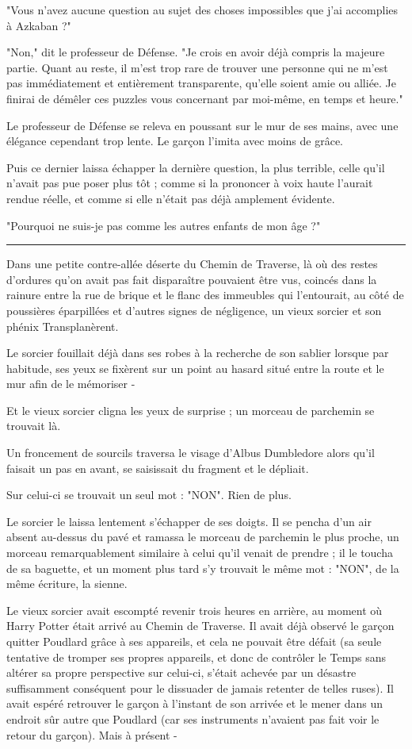 "Vous n'avez aucune question au sujet des choses impossibles que j'ai accomplies à Azkaban ?"

"Non," dit le professeur de Défense. "Je crois en avoir déjà compris la majeure partie. Quant au reste, il m'est trop rare de trouver une personne qui ne m'est pas immédiatement et entièrement transparente, qu'elle soient amie ou alliée. Je finirai de démêler ces puzzles vous concernant par moi-même, en temps et heure."

Le professeur de Défense se releva en poussant sur le mur de ses mains, avec une élégance cependant trop lente. Le garçon l'imita avec moins de grâce.

Puis ce dernier laissa échapper la dernière question, la plus terrible, celle qu'il n'avait pas pue poser plus tôt ; comme si la prononcer à voix haute l'aurait rendue réelle, et comme si elle n'était pas déjà amplement évidente.

"Pourquoi ne suis-je pas comme les autres enfants de mon âge ?"
\par\noindent\rule{\textwidth}{0.4pt}
Dans une petite contre-allée déserte du Chemin de Traverse, là où des restes d'ordures qu'on avait pas fait disparaître pouvaient être vus, coincés dans la rainure entre la rue de brique et le flanc des immeubles qui l'entourait, au côté de poussières éparpillées et d'autres signes de négligence, un vieux sorcier et son phénix Transplanèrent.

Le sorcier fouillait déjà dans ses robes à la recherche de son sablier lorsque par habitude, ses yeux se fixèrent sur un point au hasard situé entre la route et le mur afin de le mémoriser -

Et le vieux sorcier cligna les yeux de surprise ; un morceau de parchemin se trouvait là.

Un froncement de sourcils traversa le visage d'Albus Dumbledore alors qu'il faisait un pas en avant, se saisissait du fragment et le dépliait.

Sur celui-ci se trouvait un seul mot : "NON". Rien de plus.

Le sorcier le laissa lentement s'échapper de ses doigts. Il se pencha d'un air absent au-dessus du pavé et ramassa le morceau de parchemin le plus proche, un morceau remarquablement similaire à celui qu'il venait de prendre ; il le toucha de sa baguette, et un moment plus tard s'y trouvait le même mot : "NON", de la même écriture, la sienne.

Le vieux sorcier avait escompté revenir trois heures en arrière, au moment où Harry Potter était arrivé au Chemin de Traverse. Il avait déjà observé le garçon quitter Poudlard grâce à ses appareils, et cela ne pouvait être défait (sa seule tentative de tromper ses propres appareils, et donc de contrôler le Temps sans altérer sa propre perspective sur celui-ci, s'était achevée par un désastre suffisamment conséquent pour le dissuader de jamais retenter de telles ruses). Il avait espéré retrouver le garçon à l'instant de son arrivée et le mener dans un endroit sûr autre que Poudlard (car ses instruments n'avaient pas fait voir le retour du garçon). Mais à présent -

